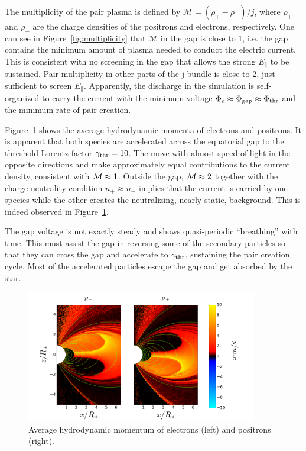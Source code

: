 The multiplicity of the pair plasma is defined by $\mathcal{M} = (\rho_+-\rho_{-})/j$,
where $\rho_+$ and $\rho_-$ are the charge densities of the positrons and electrons,
respectively. One can see in Figure~\ref{fig:multiplicity} that $\mathcal{M}$
in the gap is close to 1, i.e. the gap contains the minimum amount of plasma needed to
conduct the electric current.
This is consistent
with no screening in the gap that allows the strong $E_\parallel$ to be
sustained. Pair multiplicity in other parts of the j-bundle is
close to 2,
just sufficient to screen $E_\parallel$. Apparently, the discharge in the
simulation is self-organized to carry the current with the minimum voltage
$\Phi_e\approx\Phi_{\rm gap}\approx\Phi_{\rm thr}$ and the minimum rate of pair
creation.

Figure~\ref{fig:momenta} shows the average hydrodynamic momenta of
electrons and positrons. It is apparent that both species are accelerated across the
equatorial gap to the threshold Lorentz factor $\gamma_{\rm thr}=10$. The move with almost
speed of light in the opposite directions and make approximately equal contributions
to the current density, consistent with ${\cal M}\approx 1$.
Outside the gap,
${\cal M}\approx 2$ together with the charge neutrality condition $n_+\approx n_-$
implies that the current is carried by one species while the other creates the
neutralizing, nearly static, background. This is indeed observed in
Figure~\ref{fig:momenta}.

The gap voltage is not exactly steady and shows quasi-periodic ``breathing'' with time.
This must assist the gap in reversing some of the secondary particles so that
they can cross the gap and accelerate to $\gamma_{\rm thr}$, sustaining the pair creation cycle.
Most of the accelerated particles escape the gap and get absorbed by the star.

\begin{figure}[t]
  \centering
  \includegraphics[width=0.9\textwidth]{pics/chap4/momentum.png}
  \caption[Average hydrodynamic momenta in magnetar magnetosphere]{Average hydrodynamic momentum of electrons (left) and positrons (right).}
  \label{fig:momenta}
\end{figure}


